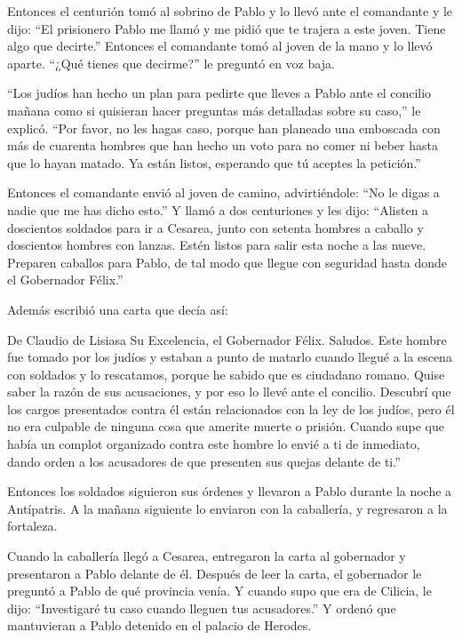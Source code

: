  Entonces el centurión tomó al sobrino de Pablo y lo llevó
ante el comandante y le dijo: ``El prisionero Pablo me llamó y me pidió
que te trajera a este joven. Tiene algo que decirte.'' 
Entonces el comandante tomó al joven de la mano y lo llevó aparte.
``¿Qué tienes que decirme?'' le preguntó en voz baja.

 ``Los judíos han hecho un plan para pedirte que lleves a
Pablo ante el concilio mañana como si quisieran hacer preguntas más
detalladas sobre su caso,'' le explicó.  ``Por favor, no
les hagas caso, porque han planeado una emboscada con más de cuarenta
hombres que han hecho un voto para no comer ni beber hasta que lo hayan
matado. Ya están listos, esperando que tú aceptes la petición.''

 Entonces el comandante envió al joven de camino,
advirtiéndole: ``No le digas a nadie que me has dicho esto.''
 Y llamó a dos centuriones y les dijo: ``Alisten a
doscientos soldados para ir a Cesarea, junto con setenta hombres a
caballo y doscientos hombres con lanzas. Estén listos para salir esta
noche a las nueve.  Preparen caballos para Pablo, de tal
modo que llegue con seguridad hasta donde el Gobernador Félix.''

 Además escribió una carta que decía así:

 De Claudio de Lisiasa Su Excelencia, el Gobernador Félix.
Saludos.  Este hombre fue tomado por los judíos y estaban a
punto de matarlo cuando llegué a la escena con soldados y lo rescatamos,
porque he sabido que es ciudadano romano.  Quise saber la
razón de sus acusaciones, y por eso lo llevé ante el concilio.
 Descubrí que los cargos presentados contra él están
relacionados con la ley de los judíos, pero él no era culpable de
ninguna cosa que amerite muerte o prisión.  Cuando supe que
había un complot organizado contra este hombre lo envié a ti de
inmediato, dando orden a los acusadores de que presenten sus quejas
delante de ti.''

 Entonces los soldados siguieron sus órdenes y llevaron a
Pablo durante la noche a Antípatris.  A la mañana siguiente
lo enviaron con la caballería, y regresaron a la fortaleza.

 Cuando la caballería llegó a Cesarea, entregaron la carta
al gobernador y presentaron a Pablo delante de él.  Después
de leer la carta, el gobernador le preguntó a Pablo de qué provincia
venía. Y cuando supo que era de Cilicia, le dijo: 
``Investigaré tu caso cuando lleguen tus acusadores.'' Y ordenó que
mantuvieran a Pablo detenido en el palacio de Herodes.

